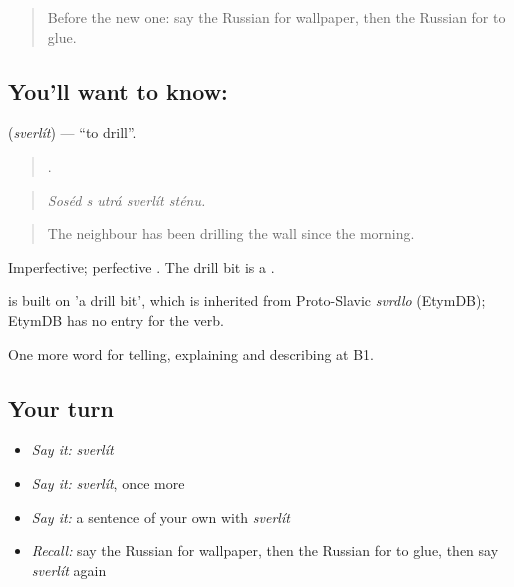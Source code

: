 \begin{quote}
Before the new one: say the Russian for wallpaper, then the Russian for to glue.
\end{quote}

\subsection*{You'll want to know: }
\textbf{} (\emph{sverlít}) — \textquotedblleft{}to drill\textquotedblright{}.

\begin{quote}
    .
\end{quote}

\begin{quote}
\emph{Soséd s utrá sverlít sténu.}
\end{quote}

\begin{quote}
The neighbour has been drilling the wall since the morning.
\end{quote}

Imperfective; perfective . The drill bit is a \emph{}.

\begin{cousinweb}
\emph{} is built on \emph{} 'a drill bit', which is inherited from Proto-Slavic \emph{svrdlo} (EtymDB); EtymDB has no entry for the verb.
\end{cousinweb}

\begin{grammarlens}[title={What you've built}]
One more word for telling, explaining and describing at B1.
\end{grammarlens}

\subsection*{Your turn}
\begin{itemize}
\raggedright
  \item \emph{Say it:} \emph{sverlít}
  \item \emph{Say it:} \emph{sverlít}, once more
  \item \emph{Say it:} a sentence of your own with \emph{sverlít}
  \item \emph{Recall:} say the Russian for wallpaper, then the Russian for to glue, then say \emph{sverlít} again
\end{itemize}

